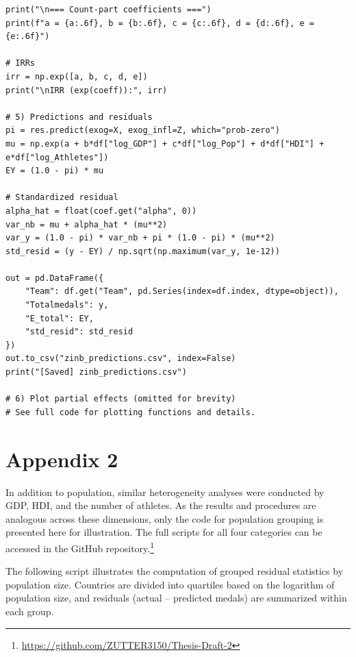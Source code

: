 \documentclass[11pt,twoside]{article}
\numberwithin{Theorem}{section}
\numberwithin{Definition}{section}
\numberwithin{Lemma}{section}
\numberwithin{Algorithm}{section}
\numberwithin{equation}{section}
\begin{document}
\begin{lstlisting}[caption={ZINB estimation on dataset1.xlsx using Python (statsmodels)}]
print("\n=== Count-part coefficients ===")
print(f"a = {a:.6f}, b = {b:.6f}, c = {c:.6f}, d = {d:.6f}, e = {e:.6f}")

# IRRs
irr = np.exp([a, b, c, d, e])
print("\nIRR (exp(coeff)):", irr)

# 5) Predictions and residuals
pi = res.predict(exog=X, exog_infl=Z, which="prob-zero")
mu = np.exp(a + b*df["log_GDP"] + c*df["log_Pop"] + d*df["HDI"] + e*df["log_Athletes"])
EY = (1.0 - pi) * mu

# Standardized residual
alpha_hat = float(coef.get("alpha", 0))
var_nb = mu + alpha_hat * (mu**2)
var_y = (1.0 - pi) * var_nb + pi * (1.0 - pi) * (mu**2)
std_resid = (y - EY) / np.sqrt(np.maximum(var_y, 1e-12))

out = pd.DataFrame({
    "Team": df.get("Team", pd.Series(index=df.index, dtype=object)),
    "Totalmedals": y,
    "E_total": EY,
    "std_resid": std_resid           
})
out.to_csv("zinb_predictions.csv", index=False)
print("[Saved] zinb_predictions.csv")

# 6) Plot partial effects (omitted for brevity)
# See full code for plotting functions and details.
\end{lstlisting}

\clearpage

\section{Appendix 2}
\label{app:two}
In addition to population, similar heterogeneity analyses were conducted by 
GDP, HDI, and the number of athletes. As the results and procedures are 
analogous across these dimensions, only the code for population grouping is 
presented here for illustration. The full scripts for all four categories can 
be accessed in the GitHub repository.\footnote{\url{https://github.com/ZUTTER3150/Thesis-Draft-2}}

The following script illustrates the computation of grouped residual statistics
by population size. Countries are divided into quartiles based on the logarithm 
of population size, and residuals (actual -- predicted medals) are summarized 
within each group.
\end{document}
